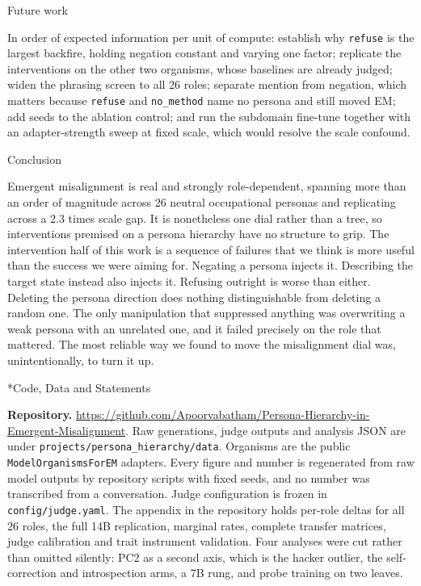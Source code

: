 \documentclass[10pt,letterpaper]{article}
\makeatletter
\renewcommand\section{\@startsection{section}{1}{0pt}{-7pt plus -1pt}{2pt}%
  {\normalfont\large\bfseries}}
\renewcommand\subsection{\@startsection{subsection}{2}{0pt}{-5pt plus -1pt}{1pt}%
  {\normalfont\normalsize\bfseries}}
\newcommand{\rt}[1]{\texttt{#1}}
\makeatother
\begin{document}
\subsection{Future work}

In order of expected information per unit of compute: establish why \rt{refuse} is the largest
backfire, holding negation constant and varying one factor; replicate the interventions on the other two
organisms, whose baselines are already judged; widen the phrasing screen to all 26 roles; separate
mention from negation, which matters because \rt{refuse} and \rt{no\_method} name no persona and still
moved EM; add seeds to the ablation control; and run the subdomain fine-tune together with an
adapter-strength sweep at fixed scale, which would resolve the scale confound.

\section{Conclusion}

Emergent misalignment is real and strongly role-dependent, spanning more than an order of magnitude
across 26 neutral occupational personas and replicating across a 2.3 times scale gap. It is nonetheless
one dial rather than a tree, so interventions premised on a persona hierarchy have no structure to grip.
The intervention half of this work is a sequence of failures that we think is more useful than the
success we were aiming for. Negating a persona injects it. Describing the target state instead also
injects it. Refusing outright is worse than either. Deleting the persona direction does nothing
distinguishable from deleting a random one. The only manipulation that suppressed anything was
overwriting a weak persona with an unrelated one, and it failed precisely on the role that mattered. The
most reliable way we found to move the misalignment dial was, unintentionally, to turn it up.

\section*{Code, Data and Statements}

\footnotesize
\textbf{Repository.} \url{https://github.com/Apoorvabatham/Persona-Hierarchy-in-Emergent-Misalignment}.
Raw generations, judge outputs and analysis JSON are under \rt{projects/persona\_hierarchy/data}.
Organisms are the public \rt{ModelOrganismsForEM} adapters. Every figure and number is regenerated from
raw model outputs by repository scripts with fixed seeds, and no number was transcribed from a
conversation. Judge configuration is frozen in \rt{config/judge.yaml}. The appendix in the repository
holds per-role deltas for all 26 roles, the full 14B replication, marginal rates, complete transfer
matrices, judge calibration and trait instrument validation. Four analyses were cut rather than omitted
silently: PC2 as a second axis, which is the hacker outlier, the self-correction and introspection arms,
a 7B rung, and probe training on two leaves.
\end{document}
